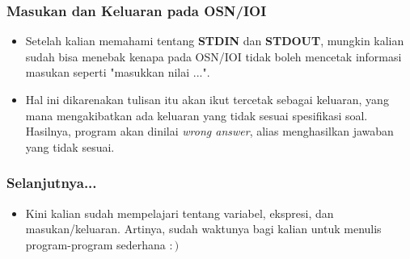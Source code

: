 \documentclass{beamer}
\begin{document}
\begin{frame}
\frametitle{Masukan dan Keluaran pada OSN/IOI}
\begin{itemize}
    \item Setelah kalian memahami tentang \textbf{STDIN} dan \textbf{STDOUT}, mungkin kalian sudah bisa menebak kenapa pada OSN/IOI tidak boleh mencetak informasi masukan seperti "masukkan nilai ...".
    \item Hal ini dikarenakan tulisan itu akan ikut tercetak sebagai keluaran, yang mana mengakibatkan ada keluaran yang tidak sesuai spesifikasi soal. Hasilnya, program akan dinilai \alert{\textit{wrong answer}}, alias menghasilkan jawaban yang tidak sesuai.
\end{itemize}
\end{frame}

\begin{frame}
\frametitle{Selanjutnya...}
\begin{itemize}
    \item Kini kalian sudah mempelajari tentang variabel, ekspresi, dan masukan/keluaran. Artinya, sudah waktunya bagi kalian untuk menulis program-program sederhana $:)$
\end{itemize}
\end{frame}
\end{document}
